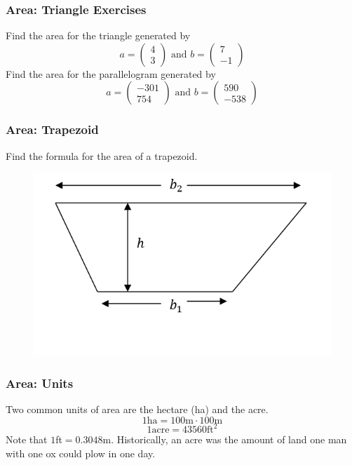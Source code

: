\documentclass[xcolor=dvipsnames]{beamer}
\begin{document}
\begin{frame}
  \frametitle{Area: Triangle Exercises}
Find the area for the triangle generated by 
\begin{equation}
  \label{eq:aateeyop}
a=\left(
  \begin{array}{c}
    4 \\
    3
  \end{array}\right)\mbox{ and }
b=\left(
  \begin{array}{c}
    7 \\
    -1
  \end{array}\right)
\end{equation}
Find the area for the parallelogram generated by 
\begin{equation}
  \label{eq:deighooz}
a=\left(
  \begin{array}{c}
    -301 \\
    754
  \end{array}\right)\mbox{ and }
b=\left(
  \begin{array}{c}
    590 \\
    -538
  \end{array}\right)
\end{equation}
\end{frame}

\begin{frame}
  \frametitle{Area: Trapezoid}
Find the formula for the area of a trapezoid.
  \begin{figure}[h]
    \includegraphics[scale=.5]{./trapezoid.png}
  \end{figure}
\end{frame}

\begin{frame}
  \frametitle{Area: Units}
Two common units of area are the \alert{hectare} (ha) and the \alert{acre}.
\begin{equation}
  \label{eq:ohfohdae}
1\mbox{ha}=100\mbox{m}\cdot{}100\mbox{m}
\end{equation}
\begin{equation}
  \label{eq:eicohrei}
1\mbox{acre}=43560\mbox{ft}^2
\end{equation}
Note that $1$ft$=0.3048$m. Historically, an acre was the amount of
land one man with one ox could plow in one day.
\end{frame}
\end{document}
